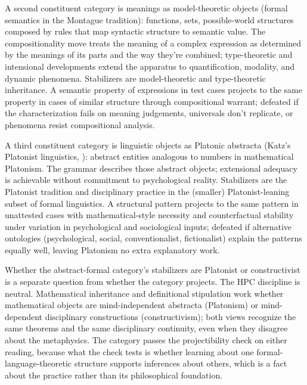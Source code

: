 \documentclass[12pt]{article}
\begin{document}
A second constituent category is meanings as model-theoretic objects (formal semantics in the Montague tradition): functions, sets, possible-world structures composed by rules that map syntactic structure to semantic value. The compositionality move treats the meaning of a complex expression as determined by the meanings of its parts and the way they're combined; type-theoretic and intensional developments extend the apparatus to quantification, modality, and dynamic phenomena. Stabilizers are model-theoretic and type-theoretic inheritance. A semantic property of expressions in test cases projects to the same property in cases of similar structure through compositional warrant; defeated if the characterization fails on meaning judgements, universals don't replicate, or phenomena resist compositional analysis.

A third constituent category is linguistic objects as Platonic abstracta (Katz's Platonist linguistics, \citealt{katz1981}): abstract entities analogous to numbers in mathematical Platonism. The grammar describes those abstract objects; extensional adequacy is achievable without commitment to psychological reality. Stabilizers are the Platonist tradition and disciplinary practice in the (smaller) Platonist-leaning subset of formal linguistics. A structural pattern projects to the same pattern in unattested cases with mathematical-style necessity and counterfactual stability under variation in psychological and sociological inputs; defeated if alternative ontologies (psychological, social, conventionalist, fictionalist) explain the patterns equally well, leaving Platonism no extra explanatory work.

Whether the abstract-formal category's stabilizers are Platonist or constructivist is a separate question from whether the category projects. The HPC discipline is neutral. Mathematical inheritance and definitional stipulation work whether mathematical objects are mind-independent abstracta (Platonism) or mind-dependent disciplinary constructions (constructivism); both views recognize the same theorems and the same disciplinary continuity, even when they disagree about the metaphysics. The category passes the projectibility check on either reading, because what the check tests is whether learning about one formal-language-theoretic structure supports inferences about others, which is a fact about the practice rather than its philosophical foundation.
\end{document}
